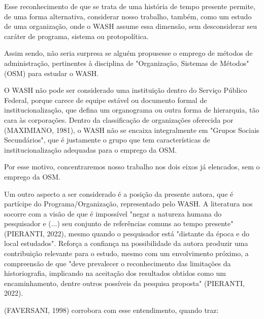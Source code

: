Esse reconhecimento de que se trata de uma história de tempo presente permite, de uma forma alternativa, considerar nosso trabalho, também, como um estudo de uma organização, onde o WASH assume essa dimensão, sem desconsiderar seu caráter de  programa, sistema ou protopolítica.

Assim sendo, não seria surpresa se alguém propusesse o emprego de métodos de administração, pertinentes à disciplina de "Organização, Sistemas de Métodos" (OSM) para estudar o WASH.


\noindent\begin{flushright}\mbox{\linespread{1}\selectfont\centering{}}\end{flushright}


O WASH não pode ser considerado uma instituição dentro do Serviço Público Federal, porque carece de equipe estável ou documento formal de institucionalização, que defina um organograma ou outra forma de hierarquia, tão cara às corporações. Dentro da classificação de organizações oferecida por (MAXIMIANO, 1981), o WASH não se encaixa integralmente em "Grupos Sociais Secundários", que é justamente o grupo que tem características de institucionalização adequadas para o emprego da OSM.

Por esse motivo, concentraremos nosso trabalho nos dois eixos já elencados, sem o emprego da OSM.

Um outro aspecto a ser considerado é a posição da presente autora, que é partícipe do Programa/Organização, representado pelo WASH. A literatura nos socorre com a visão de que é impossível "negar a natureza humana do pesquisador e (...) seu conjunto de referências comuns ao tempo presente" (PIERANTI, 2022), mesmo quando o pesquisador está "distante da época e do local estudados". Reforça a confiança na possibilidade da autora produzir uma contribuição relevante para o  estudo, mesmo com um envolvimento próximo, a compreensão de que "deve prevalecer o reconhecimento das limitações da historiografia, implicando na aceitação dos resultados obtidos como um encaminhamento, dentre outros possíveis da pesquisa proposta" (PIERANTI, 2022).

(FAVERSANI, 1998) corrobora com esse entendimento, quando traz:


